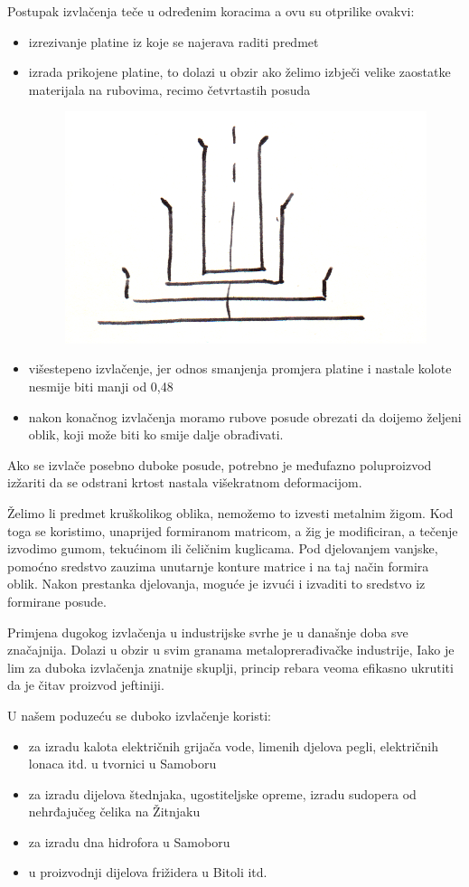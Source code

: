 \documentclass[a4paper,12pt]{article}
\numberwithin{figure}{section}
\begin{document}
Postupak izvlačenja teče u određenim koracima a ovu su otprilike ovakvi:
\begin{itemize}
\item izrezivanje platine iz koje se najerava raditi predmet
\item izrada prikojene platine, to dolazi u obzir ako želimo izbječi velike zaostatke materijala na rubovima, recimo četvrtastih posuda
\begin{figure}[!h]
\centering
\includegraphics[scale=0.15]{image_45-2.png}
\end{figure}
\FloatBarrier
\item višestepeno izvlačenje, jer odnos smanjenja promjera platine i nastale kolote nesmije biti manji od 0,48
\item nakon konačnog izvlačenja moramo rubove posude obrezati da doijemo željeni oblik, koji može biti ko smije dalje obrađivati.
\end{itemize}
Ako se izvlače posebno duboke posude, potrebno je međufazno poluproizvod izžariti da se odstrani krtost nastala višekratnom deformacijom.\par
Želimo li predmet kruškolikog oblika, nemožemo to izvesti metalnim žigom. Kod toga se koristimo, unaprijed formiranom matricom, a žig je modificiran, a tečenje izvodimo gumom, tekućinom ili čeličnim kuglicama. Pod djelovanjem vanjske, pomoćno sredstvo zauzima unutarnje konture matrice i na taj način formira oblik. Nakon prestanka djelovanja, moguće je izvući i izvaditi to sredstvo iz formirane posude. \par
Primjena dugokog izvlačenja u industrijske svrhe je u današnje doba sve značajnija. Dolazi u obzir u svim granama metaloprerađivačke industrije, Iako je lim za duboka izvlačenja znatnije skuplji, princip rebara veoma efikasno ukrutiti da je čitav proizvod jeftiniji.\par
U našem poduzeću se duboko izvlačenje koristi:
\begin{itemize}
\item za izradu kalota električnih grijača vode, limenih djelova pegli, električnih lonaca itd. u tvornici u Samoboru
\item za izradu dijelova štednjaka, ugostiteljske opreme, izradu sudopera od nehrđajučeg čelika na Žitnjaku
\item za izradu dna hidrofora u Samoboru
\item u proizvodnji dijelova frižidera u Bitoli itd.
\end{itemize}
\clearpage
\end{document}
